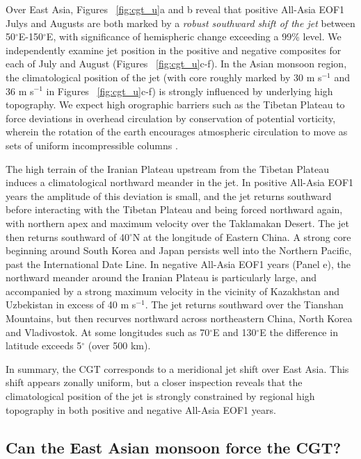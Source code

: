 	Over East Asia, Figures ~\ref{fig:cgt_u}a and b reveal that positive All-Asia EOF1 Julys and Augusts are both marked by a \textit{robust southward shift of the jet} between 50$^{\circ}$E-150$^{\circ}$E, with significance of hemispheric change exceeding a 99\% level. We independently examine jet position in the positive and negative composites for each of July and August (Figures  ~\ref{fig:cgt_u}c-f). In the Asian monsoon region, the climatological position of the jet (with core roughly marked by 30 m s$^{-1}$ and 36 m s$^{-1}$ in Figures ~\ref{fig:cgt_u}c-f) is strongly influenced by underlying high topography. We expect high orographic barriers such as the Tibetan Plateau to force deviations in overhead circulation by conservation of potential vorticity, wherein the rotation of the earth encourages atmospheric circulation to move as sets of uniform incompressible columns \citep{Holton2004a}.
	
	The high terrain of the Iranian Plateau upstream from the Tibetan Plateau induces a climatological northward meander in the jet. In positive All-Asia EOF1 years the amplitude of this deviation is small, and the jet returns southward before interacting with the Tibetan Plateau and being forced northward again, with northern apex and maximum velocity over the Taklamakan Desert. The jet then returns southward of 40$^{\circ}$N at the longitude of Eastern China. A strong core beginning around South Korea and Japan persists well into the Northern Pacific, past the International Date Line. In negative All-Asia EOF1 years (Panel e), the northward meander around the Iranian Plateau is particularly large, and accompanied by a strong maximum velocity in the vicinity of Kazakhstan and Uzbekistan in excess of 40 m s$^{-1}$. The jet returns southward over the Tianshan Mountains, but then recurves northward across northeastern China, North Korea and Vladivostok. At some longitudes such as 70$^{\circ}$E and 130$^{\circ}$E the difference in latitude exceeds 5$^{\circ}$ (over 500 km).
	
	In summary, the CGT corresponds to a meridional jet shift over East Asia. This shift appears zonally uniform, but a closer inspection reveals that the climatological position of the jet is strongly constrained by regional high topography in both positive and negative All-Asia EOF1 years.
	
\subsection{Can the East Asian monsoon force the CGT?}

